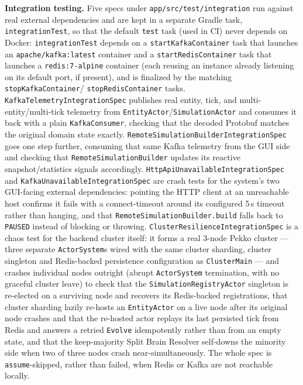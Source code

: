 \documentclass{scrreprt}
\begin{document}
\textbf{Integration testing.} Five specs under \texttt{app/src/test/integration} run against
real external dependencies and are kept in a separate Gradle task, \texttt{integrationTest}, so
that the default \texttt{test} task (used in CI) never depends on Docker:
\texttt{integrationTest} depends on a \texttt{startKafkaContainer} task that launches an
\texttt{apache/kafka:latest} container and a \texttt{startRedisContainer} task that launches a
\texttt{redis:7-alpine} container (each reusing an instance already listening on its default
port, if present), and is finalized by the matching \texttt{stopKafkaContainer}/
\texttt{stopRedisContainer} tasks. \texttt{KafkaTelemetryIntegrationSpec}
publishes real entity, tick, and multi-entity/multi-tick telemetry from
\texttt{EntityActor}/\texttt{SimulationActor} and consumes it back with a plain
\texttt{KafkaConsumer}, checking that the decoded Protobuf matches the original domain state
exactly. \texttt{RemoteSimulationBuilderIntegrationSpec} goes one step further, consuming that
same Kafka telemetry from the GUI side and checking that \texttt{RemoteSimulationBuilder}
updates its reactive snapshot/statistics signals accordingly.
\texttt{HttpApiUnavailableIntegrationSpec} and \texttt{KafkaUnavailableIntegrationSpec} are
crash tests for the system's two GUI-facing external dependencies: pointing the HTTP client at an
unreachable host confirms it fails with a connect-timeout around its configured 5\,s timeout
rather than hanging, and that \texttt{RemoteSimulationBuilder.build} falls back to
\texttt{PAUSED} instead of blocking or throwing. \texttt{ClusterResilienceIntegrationSpec} is a
chaos test for the backend cluster itself: it forms a real 3-node Pekko cluster --- three
separate \texttt{ActorSystem}s wired with the same cluster sharding, cluster singleton and
Redis-backed persistence configuration as \texttt{ClusterMain} --- and crashes individual nodes
outright (abrupt \texttt{ActorSystem} termination, with no graceful cluster leave) to check that
the \texttt{SimulationRegistryActor} singleton is re-elected on a surviving node and recovers its
Redis-backed registrations, that cluster sharding lazily re-hosts an \texttt{EntityActor} on a
live node after its original node crashes and that the re-hosted actor replays its last
persisted tick from Redis and answers a retried \texttt{Evolve} idempotently rather than from an
empty state, and that the keep-majority Split Brain Resolver self-downs the minority side when
two of three nodes crash near-simultaneously. The whole spec is \texttt{assume}-skipped, rather
than failed, when Redis or Kafka are not reachable locally.
\end{document}
